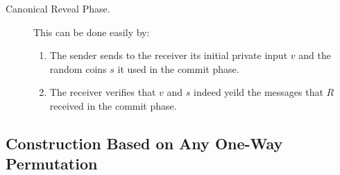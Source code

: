 \begin{description}
\item[Canonical Reveal Phase.] This can be done easily by:
\begin{enumerate}
    \item The sender sends to the receiver its initial private input $v$ and the random coins $s$ it used in the commit phase.
    \item The receiver verifies that $v$ and $s$ indeed yeild the messages that $R$ received in the commit phase.
\end{enumerate}
\end{description}

\subsection{Construction Based on Any One-Way Permutation}